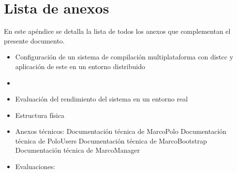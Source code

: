 \chapter{Lista de anexos}
\label{listaanexos}
En este apéndice se detalla la lista de todos los anexos que complementan el presente documento.
\citationneeded[TODO]
\begin{itemize}
\item Configuración de un sistema de compilación multiplataforma con distcc y aplicación de este en un entorno distribuido
\item \citationneeded[TODO]
\item Evaluación del rendimiento del sistema en un entorno real
\item Estructura física
\item Anexos técnicos:
\subitem Documentación técnica de MarcoPolo
\subitem Documentación técnica de PoloUsers
\subitem Documentación técnica de MarcoBootstrap
\subitem Documentación técnica de MarcoManager

\item Evaluaciones:
\subitem \citationneeded[TODO]
\end{itemize}